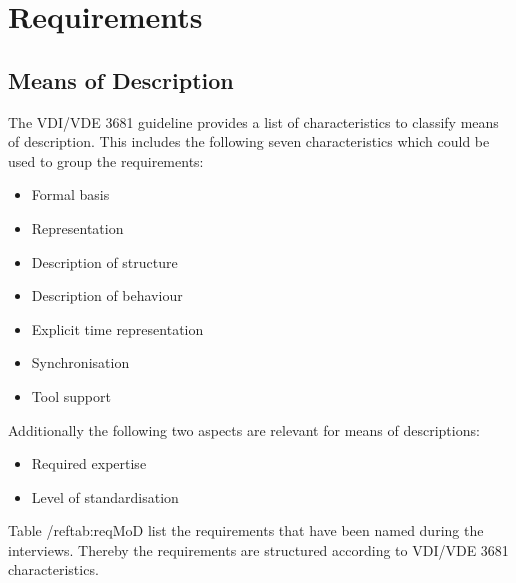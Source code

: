 \chapter{Requirements}

\label{chap: requirements}



\section{Means of Description}

The VDI/VDE 3681 guideline provides a list of characteristics to classify means of description. This includes the following seven characteristics which could be used to group the requirements:

\vspace{-10pt}
\begin{itemize}[topsep=2pt, partopsep=2pt,itemsep=2pt,parsep=2pt]
  \item Formal basis
  \item Representation
  \item Description of structure
  \item Description of behaviour
  \item Explicit time representation
  \item Synchronisation
  \item Tool support
\end{itemize}

Additionally the following two aspects are relevant for means of descriptions:

\vspace{-10pt}
\begin{itemize}[topsep=2pt, partopsep=2pt,itemsep=2pt,parsep=2pt]
  \item Required expertise
  \item Level of standardisation
\end{itemize}

Table /ref{tab:reqMoD} list the requirements that have been named during the interviews. Thereby the requirements are structured according to VDI/VDE 3681 characteristics. 


